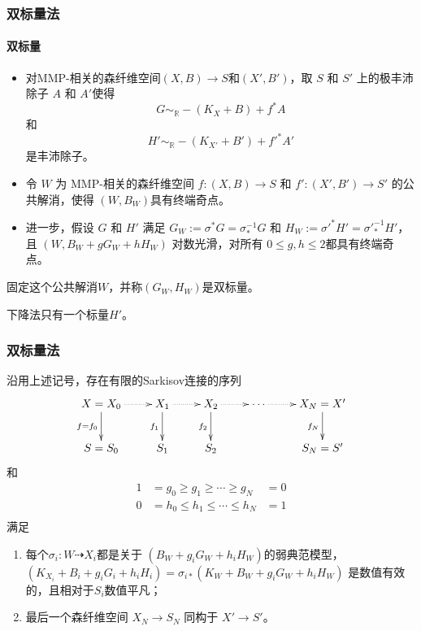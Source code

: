\documentclass[10pt]{ctexbeamer}
\begin{document}
\begin{frame}[shrink]
  \frametitle{双标量法}
  \framesubtitle{双标量}
 \begin{itemize}
  \pause
   \item 
  对MMP-相关的森纤维空间$(X,B)\to S$和$(X',B')$，取 $ S $ 和 $ S' $ 上的极丰沛除子 $ A $ 和 $ A' $使得 
  \[ G\sim_{\mathbb{R}}-(K_X+B)+f^*A \]
  和
  \[ H'\sim_{\mathbb{R}}-(K_{X'}+B')+f'^{*}A'  \]
  是丰沛除子。
  \pause
   \item 
令 $W$ 为 MMP-相关的森纤维空间 $f:(X,B)\to S$ 和 $f':(X',B')\to S'$  的公共解消，使得 $(W,B_{W})$具有终端奇点。
  \pause
   \item 
进一步，假设 $ G $ 和 $ H' $ 满足 $G_{W}:= \sigma^*G=\sigma^{-1}_*G $ 和 $ H_{W}:=\sigma'^{*}H'=\sigma'^{-1}_*H' $，且
 $(W, B_W+gG_W+hH_W)$ 对数光滑，对所有 $0\leqslant g,h\leqslant 2$都具有终端奇点。 
 \end{itemize} 
  \pause
 固定这个公共解消$W$，并称$(G_{W},H_{W})$是双标量。

 \alert{下降法只有一个标量$H'$。}
\end{frame}

\begin{frame}[shrink]
  \frametitle{双标量法}
  沿用上述记号，存在有限的Sarkisov连接的序列
  \[ \xymatrix{
    X=X_0\ar@{.>}[r]\ar[d]_{f=f_{0}}&X_{1}\ar@{.>}[r]\ar[d]_{f_{1}}& X_{2}\ar[d]_{f_{2}}\ar@{.>}[r] &\cdots\ar@{.>}[r]&X_N=X'\ar[d]_{f_{N}} \\
    S=S_{0}&S_{1} &S_{2}&&S_N=S'
    } \]
  和
  \[ \begin{aligned}
      1 & =g_0\geqslant g_1 \geqslant \cdots \geqslant g_N   & =0 \\
      0 & =h_0\leqslant h_{1} \leqslant \cdots \leqslant h_N & =1 \\
    \end{aligned} \]
  满足
  \begin{enumerate}
    \item 每个$\sigma_i:W\dashrightarrow  X_{i}$都是关于 $(B_{W}+g_{i}G_{W}+h_{i}H_{W})$的弱典范模型，$(K_{X_{i}}+B_{i}+g_{i}G_{i}+h_{i}H_{i})=\sigma_{i*}(K_{W}+B_{W}+g_{i}G_{W}+h_{i}H_{W})$ 是数值有效的，且相对于$S_{i}$数值平凡；
    \item 最后一个森纤维空间 $X_{N} \to S_{N}$ 同构于 $X'\to S'$。
  \end{enumerate}
\end{frame}
\end{document}
